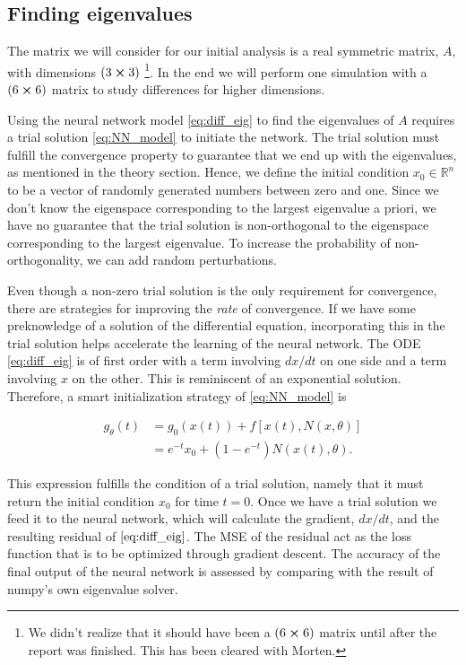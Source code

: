 \documentclass[12pt]{extarticle}
\begin{document}
\subsection{Finding eigenvalues}
The matrix we will consider for our initial analysis is a real symmetric matrix, $A$, with dimensions $(3\cross3)$ \footnote{We didn't realize that it should have been a $(6\cross6)$ matrix until after the report was finished. This has been cleared with Morten.}. In the end we will perform one simulation with a $(6\cross6)$ matrix to study differences for higher dimensions. 

Using the neural network model \eqref{eq:diff_eig} to find the eigenvalues of $A$ requires a trial solution \eqref{eq:NN_model} to initiate the network. The trial solution must fulfill the convergence property to guarantee that we end up with the eigenvalues, as mentioned in the theory section. Hence, we define the initial condition $x_0 \in \mathbb{R}^n$ to be a vector of randomly generated numbers between zero and one. Since we don't know the eigenspace corresponding to the largest eigenvalue a priori, we have no guarantee that the trial solution is non-orthogonal to the eigenspace corresponding to the largest eigenvalue. To increase the probability of non-orthogonality, we can add random perturbations.

Even though a non-zero trial solution is the only requirement for convergence, there are strategies for improving the \textit{rate} of convergence. If we have some preknowledge of a solution of the differential equation, incorporating this in the trial solution helps accelerate the learning of the neural network. The ODE \eqref{eq:diff_eig} is of first order with a term involving $dx/dt$ on one side and a term involving $x$ on the other. This is reminiscent of an exponential solution. Therefore, a smart initialization strategy of \eqref{eq:NN_model} is 

\begin{align}
	g_{\theta}(t) &= g_0(x(t)) + f[x(t),N(x, \theta)] \nonumber \\
	&= e^{-t}x_0 + (1 - e^{-t})N(x(t), \theta).
\end{align}

This expression fulfills the condition of a trial solution, namely that it must return the initial condition $x_0$ for time $t=0$. Once we have a trial solution we feed it to the neural network, which will calculate the gradient, $dx/dt$, and the resulting residual of $\eqref{eq:diff_eig}$. The MSE of the residual act as the loss function that is to be optimized through gradient descent. The accuracy of the final output of the neural network is assessed by comparing with the result of numpy's own eigenvalue solver. 
\end{document}
